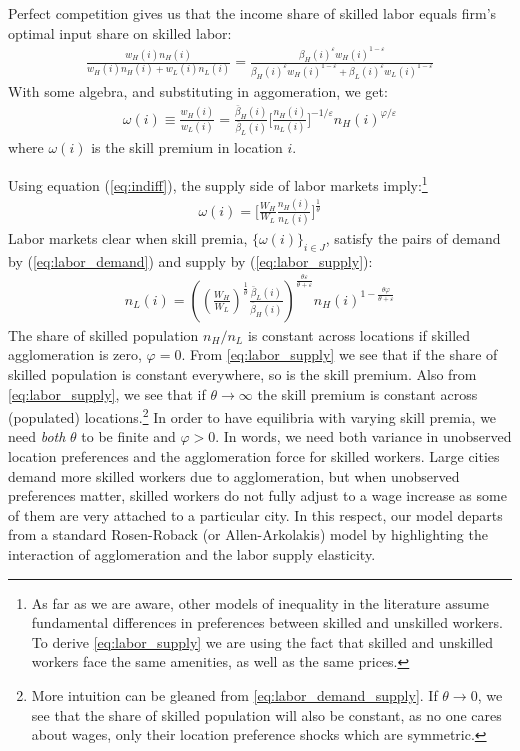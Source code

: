 \documentclass{article}
\begin{document}
Perfect competition gives us that the income share of skilled labor equals firm's optimal input share on skilled labor:
\begin{eqnarray}
\frac{w_H(i) n_H(i)}{w_H(i) n_H(i) + w_L(i) n_L(i)}  = \frac{\beta_H(i)^{\varepsilon} w_H(i)^{1-\varepsilon}}{\beta_H(i)^{\varepsilon} w_H(i)^{1-\varepsilon} + \beta_L(i)^{\varepsilon} w_L(i)^{1-\varepsilon}} \nonumber
\end{eqnarray}
With some algebra, and substituting in aggomeration, we get:
\begin{eqnarray}\label{eq:labor_demand}
	\omega(i) \equiv \frac{w_H(i)}{w_L(i)} = \frac{\bar{\beta}_H(i)}{\bar{\beta}_L(i)}\Big[ \frac{n_H(i)}{n_L(i)} \Big]^{-1/\varepsilon}n_H(i)^{\varphi/\varepsilon}
\end{eqnarray}
where $\omega(i)$ is the skill premium in location $i$.

Using equation (\ref{eq:indiff}), the supply side of labor markets imply:\footnote{As far as we are aware, other models of inequality in the literature assume fundamental differences in preferences between skilled and unskilled workers.  To derive \eqref{eq:labor_supply} we are using the fact that skilled and unskilled workers face the same amenities, as well as the same prices.}
\begin{eqnarray}\label{eq:labor_supply}
    \omega(i) = \Big[\frac{W_H}{W_L} \frac{n_H(i)}{n_L(i)} \Big]^{\frac{1}{\theta}}
\end{eqnarray}
Labor markets clear when skill premia, $\{\omega(i)\}_{i \in J}$, satisfy the pairs of demand by (\ref{eq:labor_demand}) and supply by (\ref{eq:labor_supply}):
\begin{eqnarray}\label{eq:labor_demand_supply}
    n_L(i) = \left( \left(\frac{W_H}{W_L}\right)^{\frac{1}{\theta}} \frac{\bar{\beta}_L(i)}{\bar{\beta}_H(i)} \right)^{\frac{\theta \varepsilon}{ \theta+ \varepsilon}} n_H(i)^{1-\frac{\theta \varphi}{\theta+\varepsilon}}
\end{eqnarray}
The share of skilled population $n_H/n_L$ is constant across locations if skilled agglomeration is zero, $\varphi=0$. From \eqref{eq:labor_supply} we see that if the share of skilled population is constant everywhere, so is the skill premium.  Also from \eqref{eq:labor_supply}, we see that if $\theta\rightarrow \infty$ the skill premium is constant across (populated) locations.\footnote{More intuition can be gleaned from \eqref{eq:labor_demand_supply}.  If $\theta \rightarrow 0$, we see that the share of skilled population will also be constant, as no one cares about wages, only their location preference shocks which are symmetric.}  In order to have equilibria with varying skill premia, we need \emph{both} $\theta$ to be finite and $\varphi >0$.  In words, we need both variance in unobserved location preferences and the agglomeration force for skilled workers.  Large cities demand more skilled workers due to agglomeration, but when unobserved preferences matter, skilled workers do not fully adjust to a wage increase as some of them are very attached to a particular city. In this respect, our model departs from a standard Rosen-Roback (or Allen-Arkolakis) model by highlighting the interaction of agglomeration and the labor supply elasticity. 
\end{document}
